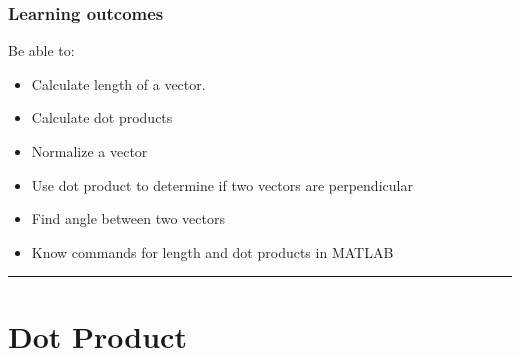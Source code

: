 %





\subsubsection*{Learning outcomes}
Be able to:
\begin{itemize}
	\item Calculate length of a vector. 
	\item Calculate dot products
	\item Normalize a vector
	\item Use dot product to determine if two vectors are perpendicular
	\item Find angle between two vectors
	\item Know commands for length and dot products in MATLAB
\end{itemize}





\rule[0.01in]{\textwidth}{0.0025in}


%
%
\section{Dot Product}

